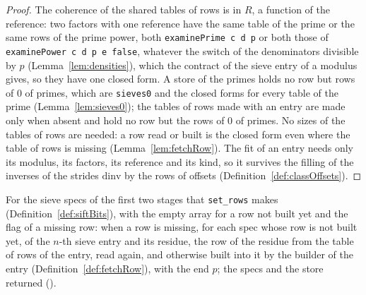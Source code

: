 \begin{proof}
  \leanok
  The coherence of the shared tables of rows is in $R$, a function of the reference: two factors
  with one reference have the same table of the prime or the same rows of the prime power, both
  \verb|examinePrime c d p| or both those of \verb|examinePower c d p e false|, whatever the switch
  of the denominators divisible by $p$ (Lemma~\ref{lem:densities}), which the contract of the sieve
  entry of a modulus gives, so they have one closed form. A store of the primes holds no row but
  rows of $0$ of primes, which are \verb|sieves0| and the closed forms for every table of the prime
  (Lemma~\ref{lem:sieves0}); the tables of rows made with an entry are made only when absent and
  hold no row but the rows of $0$ of primes. No sizes of the tables of rows are needed: a row read
  or built is the closed form even where the table of rows is missing (Lemma~\ref{lem:fetchRow}).
  The fit of an entry needs only its modulus, its factors, its reference and its kind, so it
  survives the filling of the inverses of the strides $\mathrm{dinv}$ by the rows of offsets
  (Definition~\ref{def:classOffsets}).
\end{proof}

\begin{definition}\label{def:buildRows}
  \leanok
  For the sieve specs of the first two stages that \verb|set_rows| makes
  (Definition~\ref{def:siftBits}), with the empty array for a row not built yet and the flag of a
  missing row: when a row is missing, for each spec whose row is not built yet, of the $n$-th sieve
  entry and its residue, the row of the residue from the table of rows of the entry, read again, and
  otherwise built into it by the builder of the entry (Definition~\ref{def:fetchRow}), with the end
  $p$; the specs and the store returned ().
\end{definition}

